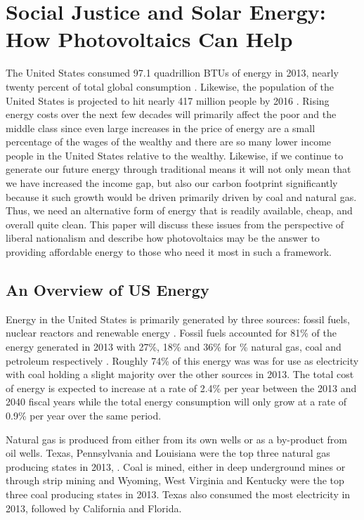 \section{Social Justice and Solar Energy: How Photovoltaics Can Help}

The United States consumed 97.1 quadrillion BTUs of energy in 2013, nearly 
twenty percent of total global consumption \cite{eiaIntStats}. Likewise, the 
population of the United States is projected to hit nearly 417 million people 
by 2016 \cite{usCensus}. Rising energy costs over the next few decades will 
primarily affect the poor and the middle class since even large increases in 
the price of energy are a small percentage of the wages of the wealthy and 
there are so many lower income people in the United States relative to the 
wealthy. Likewise, if we continue to generate our future energy through 
traditional means it will not only mean that we have increased the income gap, 
but also our carbon footprint significantly because it such growth would be 
driven primarily driven by coal and natural gas. Thus, we need an alternative 
form of energy that is readily available, cheap, and overall quite clean. This 
paper will discuss these issues from the perspective of liberal nationalism and 
describe how photovoltaics may be the answer to providing affordable energy to 
those who need it most in such a framework.

\subsection{An Overview of US Energy}

Energy in the United States is primarily generated by three sources: fossil 
fuels, nuclear reactors and renewable energy \cite{eiaAEO2015}. Fossil fuels 
accounted for 81\% of the energy generated in 2013 with 27\%, 18\% and 36\% for 
\% natural gas, coal and petroleum respectively \cite{eiaAEO2015}. Roughly 74\%
of this energy was was for use as electricity with coal holding a slight 
majority over the other sources in 2013. The total cost of energy is expected 
to increase at a rate of 2.4\% per year between the 2013 and 2040 fiscal years 
while the total energy consumption will only grow at a rate of 0.9\% per year 
over the same period.

Natural gas is produced from either from its own wells or as a by-product from 
oil wells. Texas, Pennsylvania and Louisiana were the top three natural gas 
producing states in 2013, \cite{eiaAEO2015}. Coal is mined, either in deep 
underground mines or through strip mining and Wyoming, West Virginia and Kentucky 
were the top three coal producing states in 2013. Texas also consumed the most 
electricity in 2013, followed by California and Florida.

